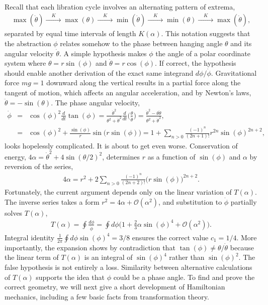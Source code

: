 \documentclass[nofootinbib,preprint]{revtex4-1}
\begin{document}
Recall that each libration cycle involves an alternating pattern of extrema,
\begin{eqnarray}
\max(\dot{\theta}) \xrightarrow{\;\;\;\;K\;\;\;\;} \max(\theta) 
 \xrightarrow{\;\;\;\;K\;\;\;\;} \min(\dot{\theta})
 \xrightarrow{\;\;\;\;K\;\;\;\;} \min(\theta) 
 \xrightarrow{\;\;\;\;K\;\;\;\;} \max(\dot{\theta}) \nonumber,
\end{eqnarray} 
separated by equal time intervals of length $K(\alpha)$. This notation suggests that the 
abstraction $\phi$ relates somehow to the phase between hanging angle $\theta$ and its angular 
velocity $\dot{\theta}$. A simple hypothesis makes $\phi$ the angle of a polar coordinate
system where $\theta=r\sin(\phi)$ and $\dot{\theta}=r\cos(\phi)$. If correct, the hypothesis should 
enable another derivation of the exact same integrand $d\phi/\dot{\phi}$. Gravitational force 
$mg=1$ downward along the vertical results in a partial force along the tangent of motion, 
which affects an angular acceleration, and by Newton's laws, $\ddot{\theta}=-\sin(\theta)$. 
The phase angular velocity,
\begin{eqnarray}
\dot{\phi} &=& \cos(\phi)^2 \frac{d}{dt} \tan(\phi) 
= \frac{\dot{\theta}^2}{\theta^2+\dot{\theta}^2}\frac{d}{dt}\bigg(\frac{\theta}{\dot{\theta}}\bigg)
=\frac{\dot{\theta}^2-\theta\ddot{\theta} }{\theta^2+\dot{\theta}^2}, \nonumber \\
&=& \cos(\phi)^2+\frac{\sin(\phi)}{r}\sin\big(r \sin(\phi)\big) \nonumber 
 = 1+\sum_{n>0} \frac{(-1)^n}{(2n+1)!} r^{2n} \sin(\phi)^{2n+2}, \nonumber
\end{eqnarray}
looks hopelessly complicated. It is about to get even worse. Conservation of 
energy, ${4 \alpha=\dot{\theta}^2+4 \sin(\theta/2)^2}$, 
determines $r$ as a function of $\sin(\phi)$ and $\alpha$ by reversion of the series,
\begin{eqnarray}
4\alpha = r^2 + 2\sum_{n>0}\frac{(-1)^n }{(2n+2)!} \big(r \sin(\phi)\big)^{2n+2} . \nonumber
\end{eqnarray}
Fortunately, the current argument depends only on the 
linear variation of $T(\alpha)$. The inverse series takes a form $r^2=4\alpha + \mathcal{O}(\alpha^2)$, 
and substitution to $\dot{\phi}$ partially solves $T(\alpha)$, 
\begin{eqnarray}
T(\alpha)= \oint \frac{d\phi}{\dot{\phi}} = \oint d\phi\bigg(1+\frac{2}{3}\alpha\sin(\phi)^4 + \mathcal{O}(\alpha^2) \bigg).\nonumber
\end{eqnarray}
Integral identity $\tfrac{1}{2\pi}\oint d\phi \sin(\phi)^4=3/8$ ensures the correct value $c_1=1/4$. More 
importantly, the expansion shows by contradiction that $\tan(\phi) \neq \theta/\dot{\theta}$ 
because the linear term of $T(\alpha)$ is an integral of $\sin(\phi)^4$ rather than $\sin(\phi)^2$.
The false hypothesis is not entirely a loss. Similarity between alternative calculations of 
$T(\alpha)$ supports the idea that $\phi$ could be a phase angle. To find and prove the correct 
geometry, we will next give a short development of Hamiltonian mechanics, including a few basic 
facts from transformation theory.
\end{document}

